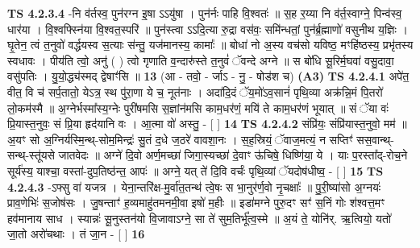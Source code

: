 \documentclass[17pt]{extarticle}
\begin{document}
                  \newline
                                \textbf{ TS 4.2.3.4} \newline
                  -नि व॑र्तस्व॒ पुन॑रग्न इ॒षा ऽऽयु॑षा । पुन॑र्नः पाहि वि॒श्वतः॑ ॥ स॒ह र॒य्या नि व॑र्त॒स्वाग्ने॒ पिन्व॑स्व॒ धार॑या । वि॒श्वफ्स्नि॑या वि॒श्वत॒स्परि॑ ॥ पुन॑स्त्वा ऽऽदि॒त्या रु॒द्रा वस॑वः॒ समि॑न्धतां॒ पुन॑र्ब्र॒ह्माणो॑ वसुनीथ य॒ज्ञिः । घृ॒तेन॒ त्वं त॒नुवो॑ वर्द्धयस्व स॒त्याः स॑न्तु॒ यज॑मानस्य॒ कामाः᳚ ॥ बोधा॑ नो अ॒स्य वच॑सो यविष्ठ॒ मꣳहि॑ष्ठस्य॒ प्रभृ॑तस्य स्वधावः । पीय॑ति त्वो॒ अनु॑ ( ) त्वो गृणाति व॒न्दारु॑स्ते त॒नुवं॑ ॅवन्दे अग्ने ॥ स बो॑धि सू॒रिर्म॒घवा॑ वसु॒दावा॒ वसु॑पतिः । यु॒यो॒द्ध्य॑स्मद् द्वेषाꣳ॑सि ॥ \textbf{  13} \newline
                  \newline
                      (आ - तवो॒ - र्जाऽ - नु॒ - षोड॑श च)  \textbf{(A3)} \newline \newline
                                        \textbf{ TS 4.2.4.1} \newline
                  अपे॑त॒ वीत॒ वि च॑ सर्प॒तातो॒ येऽत्र॒ स्थ पु॑रा॒णा ये च॒ नूत॑नाः । अदा॑दि॒दं ॅय॒मो॑ऽव॒सानं॑ पृथि॒व्या अक्र॑न्नि॒मं पि॒तरो॑ लो॒कम॑स्मै ॥ अ॒ग्नेर्भस्मा᳚स्य॒ग्नेः पुरी॑षमसि स॒ज्ञांन॑मसि काम॒धर॑णं॒ मयि॑ ते काम॒धर॑णं भूयात् ॥ सं ॅया वः॑ प्रि॒यास्त॒नुवः॒ सं प्रि॒या हृद॑यानि वः । आ॒त्मा वो॑ अस्तु॒ - [  ] \textbf{  14} \newline
                  \newline
                                \textbf{ TS 4.2.4.2} \newline
                  संप्रि॑यः॒ संप्रि॑यास्त॒नुवो॒ मम॑ ॥ अ॒यꣳ सो अ॒ग्निर्यस्मि॒न्थ्-सोम॒मिन्द्रः॑ सु॒तं द॒धे ज॒ठरे॑ वावशा॒नः । स॒ह॒स्रियं॒ ॅवाज॒मत्यं॒ न सप्तिꣳ॑ सस॒वान्थ्-सन्थ्-स्तू॑यसे जातवेदः ॥ अग्ने॑ दि॒वो अर्ण॒मच्छा॑ जिगा॒स्यच्छा॑ दे॒वाꣳ ऊ॑चिषे॒ धिष्णि॑या॒ ये । याः प॒रस्ता᳚द्-रोच॒ने सूर्य॑स्य॒ याश्चा॒ वस्ता॑-दुप॒तिष्ठ॑न्त॒ आपः॑ ॥ अग्ने॒ यत् ते॑ दि॒वि वर्चः॑ पृथि॒व्यां ॅयदोष॑धीष्व॒ - [  ] \textbf{  15} \newline
                  \newline
                                \textbf{ TS 4.2.4.3} \newline
                  -ऽफ्सु वा॑ यजत्र । येना॒न्तरि॑क्ष-मु॒र्वा॑त॒तन्थ॑ त्वे॒षः स भा॒नुर॑र्ण॒वो नृ॒चक्षाः᳚ ॥ पु॒री॒ष्या॑सो अ॒ग्नयः॑ प्राव॒णेभिः॑ स॒जोष॑सः । जु॒षन्ताꣳ॑ ह॒व्यमाहु॑तमनमी॒वा इषो॑ म॒हीः ॥ इडा॑मग्ने पुरु॒दꣳ सꣳ॑ स॒निं गोः श॑श्वत्त॒मꣳ हव॑मानाय साध । स्यान्नः॑ सू॒नुस्तन॑यो वि॒जावाऽग्ने॒ सा ते॑ सुम॒तिर्भू᳚त्व॒स्मे ॥ अ॒यं ते॒ योनि॑र्. ऋ॒त्वियो॒ यतो॑ जा॒तो अरो॑चथाः । तं जा॒न - [  ] \textbf{  16} \newline
\end{document}
